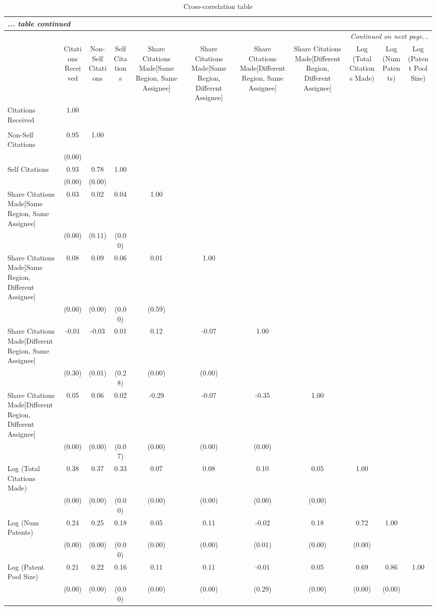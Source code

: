 
\begin{center}
\begin{longtable}{l  c  c  c  c  c  c  c  c  c  c }
\caption{Cross-correlation table\label{corrtable}}\\ 
 \hline\hline
\endfirsthead
\multicolumn{11}{l}{\emph{... table \thetable{} continued}}
 \\ \hline 
\endhead
\hline
\multicolumn{11}{r}{\emph{Continued on next page...}}\\
\endfoot
\hline\hline
\endlastfoot
\multicolumn{1}{c}{Variables} &Citations Received&Non-Self Citations&Self Citations&Share Citations Made[Same Region, Same Assignee]&Share Citations Made[Same Region, Different Assignee]&Share Citations Made[Different Region, Same Assignee]&Share Citations Made[Different Region, Different Assignee]&Log (Total Citations Made)&Log (Num Patents)&Log (Patent Pool Size)\\ \hline
Citations Received&1.00\\
 &\\
Non-Self Citations&0.95&1.00\\
&(0.00) &\\
Self Citations&0.93&0.78&1.00\\
&(0.00)&(0.00) &\\
Share Citations Made[Same Region, Same Assignee]&0.03&0.02&0.04&1.00\\
&(0.00)&(0.11)&(0.00) &\\
Share Citations Made[Same Region, Different Assignee]&0.08&0.09&0.06&0.01&1.00\\
&(0.00)&(0.00)&(0.00)&(0.59) &\\
Share Citations Made[Different Region, Same Assignee]&-0.01&-0.03&0.01&0.12&-0.07&1.00\\
&(0.30)&(0.01)&(0.28)&(0.00)&(0.00) &\\
Share Citations Made[Different Region, Different Assignee]&0.05&0.06&0.02&-0.29&-0.07&-0.35&1.00\\
&(0.00)&(0.00)&(0.07)&(0.00)&(0.00)&(0.00) &\\
Log (Total Citations Made)&0.38&0.37&0.33&0.07&0.08&0.10&0.05&1.00\\
&(0.00)&(0.00)&(0.00)&(0.00)&(0.00)&(0.00)&(0.00) &\\
Log (Num Patents)&0.24&0.25&0.18&0.05&0.11&-0.02&0.18&0.72&1.00\\
&(0.00)&(0.00)&(0.00)&(0.00)&(0.00)&(0.01)&(0.00)&(0.00) &\\
Log (Patent Pool Size)&0.21&0.22&0.16&0.11&0.11&-0.01&0.05&0.69&0.86&1.00\\
&(0.00)&(0.00)&(0.00)&(0.00)&(0.00)&(0.29)&(0.00)&(0.00)&(0.00)\\
\end{longtable}
\end{center}
